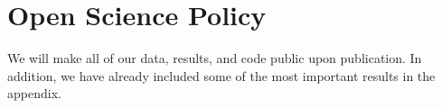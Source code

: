 \clearpage


\section*{Open Science Policy}

We will make all of our data, results, and code public upon
publication. In addition, we have already included some of the most
important results in the appendix.


